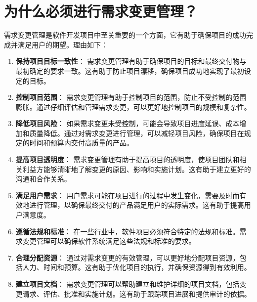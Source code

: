 \documentclass[11pt, a4paper, oneside]{ctexbook}
\let\kaishu\relax                               %
\begin{document}
\chapter{为什么必须进行需求变更管理？}
需求变更管理是软件开发项目中至关重要的一个方面，它有助于确保项目的成功完成并满足用户的期望。理由如下：
\begin{enumerate}
    \item {\bfseries\kaishu 保持项目目标一致性}： 需求变更管理有助于确保项目的目标和最终交付物与最初确定的要求一致。这有助于防止项目漂移，确保项目成功地实现了最初设定的目标。
    \item {\bfseries\kaishu 控制项目范围}： 需求变更管理有助于控制项目的范围，防止不受控制的范围膨胀。通过仔细评估和管理需求变更，可以更好地控制项目的规模和复杂性。
    \item {\bfseries\kaishu 降低项目风险}： 如果需求变更未受控制，可能会导致项目进度延误、成本增加和质量降低。通过对需求变更进行管理，可以减轻项目风险，确保项目在规定的时间和预算内交付高质量的产品。
    \item {\bfseries\kaishu 提高项目透明度}： 需求变更管理有助于提高项目的透明度，使项目团队和相关利益方能够清晰地了解变更的原因、影响和实施计划。这有助于建立更好的沟通和合作关系。
    \item {\bfseries\kaishu 满足用户需求}： 用户需求可能在项目进行的过程中发生变化，需要及时而有效地进行管理，以确保最终交付的产品满足用户的实际需求。这有助于提高用户满意度。
    \item {\bfseries\kaishu 遵循法规和标准}： 在一些行业中，软件项目必须符合特定的法规和标准。需求变更管理可以确保软件系统满足这些法规和标准的要求。
    \item {\bfseries\kaishu 合理分配资源}： 通过对需求变更的有效管理，可以更好地分配项目资源，包括人力、时间和预算。这有助于优化项目的执行，并确保资源得到有效利用。
    \item {\bfseries\kaishu 建立项目文档}： 需求变更管理可以帮助建立和维护详细的项目文档，包括变更请求、评估、批准和实施计划。这有助于跟踪项目进展和提供审计的依据。
\end{enumerate}
\end{document}
